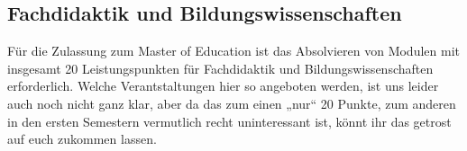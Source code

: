 \subsection{Fachdidaktik und Bildungswissenschaften}

Für die Zulassung zum Master of Education ist das Absolvieren von Modulen mit
insgesamt 20 Leistungspunkten für Fachdidaktik und Bildungswissenschaften
erforderlich. Welche Verantstaltungen hier so angeboten werden, ist uns leider
auch noch nicht ganz klar, aber da das zum einen „nur“ 20 Punkte, zum anderen
in den ersten Semestern vermutlich recht uninteressant ist, könnt ihr das
getrost auf euch zukommen lassen.

%
%
%
%
%



